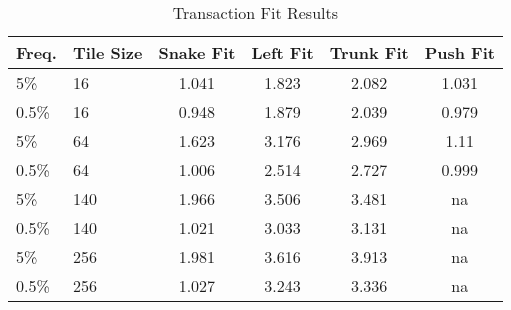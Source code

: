\begin{table}
	\begin{center}
		\begin{tabular}{|l|l|c|c|c|c|}
			\hline
			Freq. & Tile Size & Snake Fit & Left Fit & Trunk Fit & Push Fit \\
			\hline
			5\% & 16 & 1.041 & 1.823 & 2.082 & 1.031 \\
			\hline
			0.5\% & 16 & 0.948 & 1.879 & 2.039 & 0.979 \\
			\hline
			5\% & 64 & 1.623 & 3.176 & 2.969 & 1.11 \\
			\hline
			0.5\% & 64 & 1.006 & 2.514 & 2.727 & 0.999 \\
			\hline
			5\% & 140 & 1.966 & 3.506 & 3.481 & na \\
			\hline
			0.5\% & 140 & 1.021 & 3.033 & 3.131 & na \\
			\hline
			5\% & 256 & 1.981 & 3.616 & 3.913 & na \\
			\hline
			0.5\% & 256 & 1.027 & 3.243 & 3.336 & na \\
			\hline
		\end{tabular}
	\end{center}
	\caption{Transaction Fit Results}
	\label{tab:fit}
\end{table}